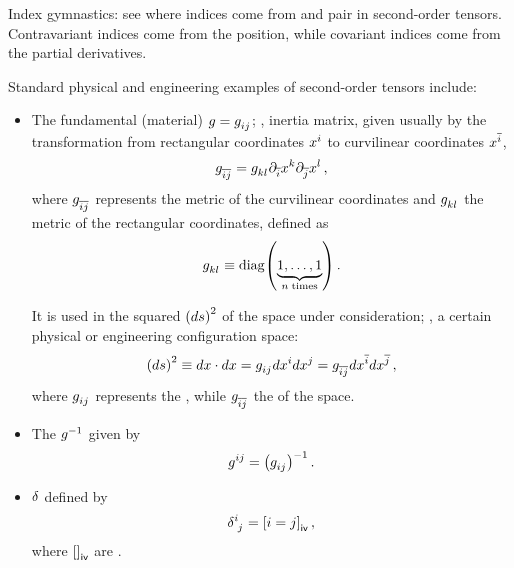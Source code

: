 \begin{note}
  Index gymnastics: see where indices come from and pair in second-order tensors. Contravariant indices come from the position, while covariant indices come from the partial derivatives.
\end{note}

Standard physical and engineering examples of second-order tensors include:
%
\begin{itemize}
  \item The fundamental (material)  $\metric = \tcovmet ij$; \ie, inertia matrix, given usually by the transformation from rectangular coordinates $\tvec\pos i$ to curvilinear coordinates $\atvec\pos i$,
  \begin{equation}
    \atcovmet ij = \tcovmet kl\aipd i\tvec\pos k\aipd j\tvec\pos l\,,
  \end{equation}
  where $\atcovmet ij$ represents the metric of the curvilinear coordinates and $\tcovmet kl$ the metric of the rectangular coordinates, defined as
  \begin{equation}\label{eq:metriccoordinatetransformation}
    \tcovmet kl\defas\diag\tuple{\underbrace{1,\dotsc,1}_{n\;\text{times}}}\,.
  \end{equation}
  
  It is used in the  squared $\sqlinelem$ of the space under consideration; \eg, a certain physical or engineering configuration space:
  \begin{equation*}
    \sqlinelem  \defas d\pos\iprod d\pos 
                = \tcovmet ij d\tvec\pos i d\tvec\pos j 
                = \atcovmet ij d\atvec\pos i d\atvec\pos j\,,
  \end{equation*}
  where $\tcovmet ij$ represents the , while $\atcovmet ij$ the  of the space.
  \item The  $g^{-1}$ given by
  \begin{equation*}
    \tvecmet ij = \parens{\tcovmet ij}^{-1}\,.
  \end{equation*}
  \item {} $\delta$ defined by
  \begin{equation*}
    \tkron{^i_j} = \iverson{i = j}\,,
  \end{equation*}
  where $\iverson{}$ are .
\end{itemize}


